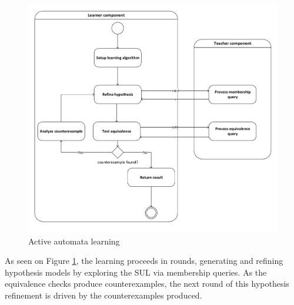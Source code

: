 \begin{figure}[!ht]
	\centering
	\includegraphics[width=1.0\linewidth]{figures/flowchartlearning}
	\caption{Active automata learning}
	\label{fig:flowchartlearning}
\end{figure}

As seen on Figure \ref{fig:flowchartlearning}, the learning proceeds in rounds, generating and refining hypothesis models by exploring the SUL via membership queries. As the equivalence checks produce counterexamples, the next round of this hypothesis refinement is driven by the counterexamples produced.

